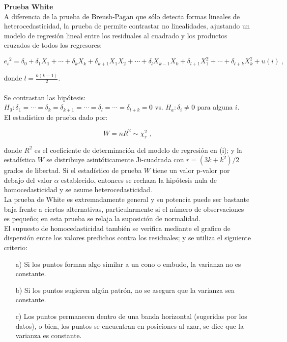 \textbf{Prueba White} ~\parencite{verbeek-2004} \\

A diferencia de la prueba de Breush-Pagan que sólo detecta formas lineales de heterocedasticidad, la prueba de \textcite{white-1980} permite contrastar no linealidades, ajustando un modelo de regresión lineal entre los residuales al cuadrado y los productos cruzados de todos los regresores:


\begin{center}
	$${e_i} ^2=\delta _0 + \delta _1 X_1+ \cdots + \delta _{k} X_k + \delta _{k+1} X_1 X_2+ \cdots +\delta _l X_{k-1} X_k+  \delta _{l+1} X_1 ^2 + \cdots  + \delta _{l+k} X_k ^2 + u(i) \; , $$
\end{center}


donde {\large $l=\frac{k(k-1)}{2}$}.\\ \\
Se contrastan las hipótesis:\\
$H_0: \delta _1 =  \cdots =\delta _k=\delta _{k+1} =  \cdots =\delta _l= \cdots=\delta_{l+k} =0 $  vs.  $H_a: \delta_i \neq 0$ para alguna $i$.\\

El estadístico de prueba dado por:

\begin{center}
	$$W=n R^2 \sim \chi_r ^2 \; ,$$
\end{center}


donde $R^2$ es el coeficiente de determinación del modelo de regresión en (i); y la estadística $W$ se distribuye asintóticamente Ji-cuadrada con $r=(3k + k^2)/2$ grados de libertad. Si el estadístico de prueba $W$  tiene un valor p-valor por debajo del valor $\alpha$ establecido, entonces se rechaza la hipótesis nula de homocedasticidad y se asume heterocedasticidad.\\


La prueba de White es extremadamente general y su potencia puede ser bastante baja frente a ciertas alternativas, particularmente si el número de observaciones es pequeño; en esta prueba se relaja la suposición de normalidad. \\

El supuesto de homocedasticidad también se verifica mediante el grafico de dispersión entre los valores predichos  contra los residuales; y se utiliza el siguiente criterio:\\

\begin{itemize}
	\item[a)] Si los puntos forman algo similar a un cono o embudo, la varianza no es constante.
	
	\item[b)] Si los puntos sugieren algún patrón, no se asegura que la varianza sea constante.
	
	\item[c)] Los puntos permanecen dentro de una banda horizontal (sugeridas por los datos), o bien, los puntos se encuentran en posiciones al azar, se dice que la varianza es constante. \\
\end{itemize}



